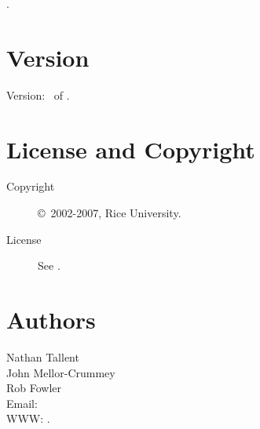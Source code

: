 \documentclass[english]{article}
\begin{document}
.

\section{Version}

Version: \Version\ of \Date.

\section{License and Copyright}

\begin{description}
\item[Copyright] \copyright\ 2002-2007, Rice University.
\item[License] See .
\end{description}

\section{Authors}

\noindent
Nathan Tallent \\
John Mellor-Crummey \\
Rob Fowler \\
Email:  \\
WWW: .

\LatexManEnd
\end{document}

